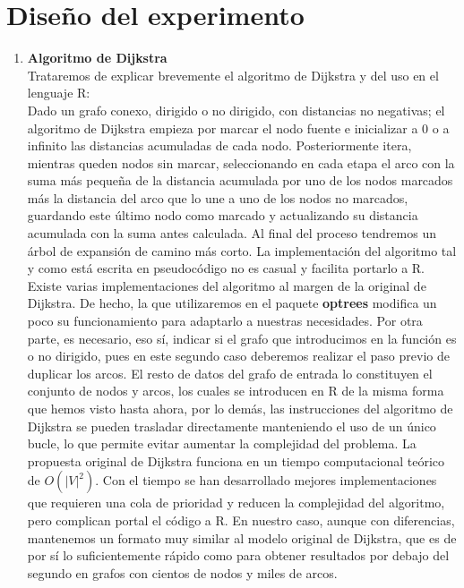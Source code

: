 \documentclass[a4,papper]{IEEEtran}
\title{}
\author{}
\begin{document}
\section{\bf Diseño del experimento}
\begin{enumerate}
    \item {\bf {Algoritmo de Dijkstra}}\\
    Trataremos de explicar brevemente el algoritmo de Dijkstra y del uso en el lenguaje R:\\
    Dado un grafo conexo, dirigido o no dirigido, con distancias no negativas; el algoritmo de Dijkstra empieza por marcar el nodo fuente e inicializar a 0 o a infinito las distancias acumuladas de cada nodo. Posteriormente itera, mientras queden nodos sin marcar, seleccionando en cada etapa el arco con la suma más pequeña de la distancia acumulada por uno de los nodos marcados más la distancia del arco que lo une a uno de los nodos no marcados, guardando este último nodo como marcado y actualizando su distancia acumulada con la suma antes calculada. Al final del proceso tendremos un árbol de expansión de camino más corto.
    La implementación del algoritmo tal y como está escrita en pseudocódigo no es casual y facilita portarlo a R. Existe varias implementaciones del algoritmo al margen de la original de Dijkstra. De hecho, la que utilizaremos en el paquete {\bf optrees} modifica un poco su funcionamiento para adaptarlo a nuestras necesidades. Por otra parte, es necesario, eso sí, indicar si el grafo que introducimos en la función es o no dirigido, pues en este segundo caso deberemos realizar el paso previo de duplicar los arcos. El resto de datos del grafo de entrada lo constituyen el conjunto de nodos y arcos, los cuales se introducen en R de la misma forma que hemos visto hasta ahora, por lo demás, las instrucciones del algoritmo de Dijkstra se pueden trasladar directamente manteniendo el uso de un único bucle, lo que permite evitar aumentar la complejidad del problema. La propuesta original de Dijkstra funciona en un tiempo computacional teórico de $O(|V|^2)$. Con el tiempo se han desarrollado mejores implementaciones que requieren una cola de prioridad y reducen la complejidad del algoritmo, pero complican portal el código a R. En nuestro caso, aunque con diferencias, mantenemos un formato muy similar al modelo original de Dijkstra, que es de por sí lo suficientemente rápido como para obtener resultados por debajo del segundo en grafos con cientos de nodos y miles de arcos.

\end{enumerate}
\end{document}
